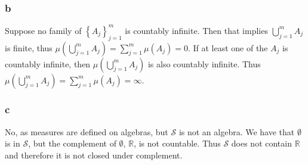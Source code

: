 \documentclass{article}
\theoremstyle{definition}
\numberwithin{theorem}{section}
\numberwithin{equation}{section}
\newcommand{\sig}{\mathcal{S}}
\begin{document}
\subsubsection{b}
Suppose no family of $\left\lbrace A_j \right\rbrace_{j = 1}^m$ is countably infinite. Then that implies $\bigcup_{j = 1}^m A_j$ is finite, thus $\mu(\bigcup_{j = 1}^m A_j) = \sum_{j = 1}^m \mu(A_j) = 0$. If at least one of the $A_j$ is countably infinite, then $\mu(\bigcup_{j = 1}^m A_j)$ is also countably infinite. Thus $\mu(\bigcup_{j = 1}^m A_j) = \sum_{j = 1}^m \mu(A_j) = \infty$.
\subsubsection{c}
No, as measures are defined on algebras, but $\sig$ is not an algebra. We have that $\emptyset$ is in $\sig$, but the complement of $\emptyset$, $\mathbb{R}$, is not countable. Thus $\sig$ does not contain $\mathbb{R}$ and therefore it is not closed under complement.
\end{document}
